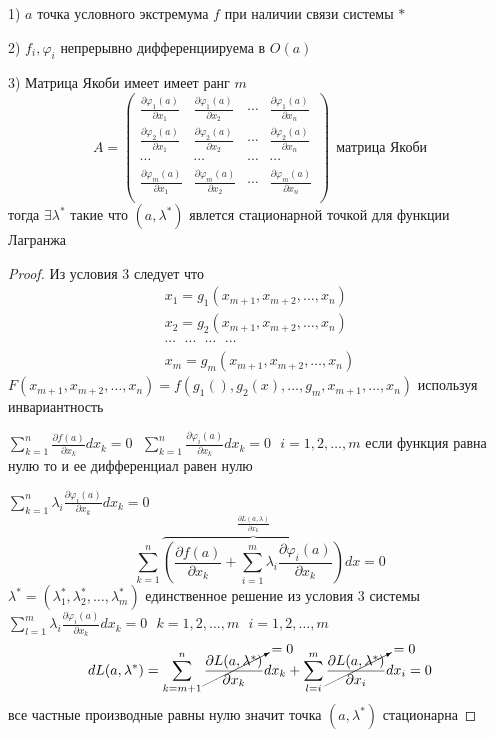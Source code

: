 \begin{theorem}
  1) $a$ точка условного экстремума $f$ при наличии связи системы $*$

  2) $f_i, \varphi_i$ непрерывно дифференциируема в $O(a)$

  3) Матрица Якоби имеет имеет ранг $m$
  $$
  A =
  \left(
  \begin{array}{cccc}
    \frac{\partial \varphi_1(a)}{\partial x_1} &
    \frac{\partial \varphi_1(a)}{\partial x_2} &
    \cdots &
    \frac{\partial \varphi_1(a)}{\partial x_n} \\

    \frac{\partial \varphi_2(a)}{\partial x_1} &
    \frac{\partial \varphi_2(a)}{\partial x_2} &
    \cdots &
    \frac{\partial \varphi_2(a)}{\partial x_n} \\
    \cdots & \cdots & \cdots & \cdots \\

    \frac{\partial \varphi_m(a)}{\partial x_1} &
    \frac{\partial \varphi_m(a)}{\partial x_2} &
    \cdots &
    \frac{\partial \varphi_m(a)}{\partial x_n} \\
  \end{array}
  \right) ~~ \text{матрица Якоби}
  $$
  тогда $\exists \lambda^*$ такие что $(a, \lambda^*)$ явлется стационарной
  точкой для функции Лагранжа
\end{theorem}

\begin{proof}
  Из условия 3 следует что
  $$
  \begin{array}{c}
    x_1 = g_1(x_{m+1}, x_{m+2}, \ldots, x_n) \\
    x_2 = g_2(x_{m+1}, x_{m+2}, \ldots, x_n) \\
    \cdots ~~~ \cdots ~~~ \cdots ~~~ \cdots \\
    x_m = g_m(x_{m+1}, x_{m+2}, \ldots, x_n)
  \end{array}
  $$
  $F(x_{m+1}, x_{m+2}, \ldots, x_n) = f(g_1(), g_2(x), \ldots, g_m, x_{m+1},
  \ldots, x_n)$ используя инвариантность

  $\sum_{k=1}^n \frac{\partial f(a)}{\partial x_k} dx_k = 0 ~~~
  \sum_{k=1}^n \frac{\partial \varphi_i(a)}{\partial x_k} dx_k = 0 ~~~
  i = 1, 2, \ldots, m$ если функция равна нулю то и ее дифференциал равен нулю

  $\sum_{k=1}^n \lambda_i \frac{\partial \varphi_i(a)}{\partial x_k} dx_k = 0$
  $$
  \sum_{k=1}^n \overbrace{\left( \frac{\partial f(a)}{\partial x_k} +
  \sum_{i=1}^m \lambda_i \frac{\partial \varphi_i(a)}{\partial x_k}
  \right)}^{\frac{\partial L(a, \lambda)}{\partial x_k}}dx = 0
  $$
  $\lambda^* = (\lambda_1^*, \lambda_2^*, \ldots, \lambda_m^*)$ единственное
  решение из условия 3 системы
  $\sum_{l=1}^m \lambda_i \frac{\partial \varphi_i(a)}{\partial x_k} dx_k = 0
  ~~~ k = 1,2,\ldots, m ~~~ i = 1,2,\ldots, m$
  $$
  dL(a, \lambda^*) = \sum_{k = m+1}^n \cancelto{= 0}{\frac{\partial
  L(a, \lambda^*)}{\partial x_k}} dx_k + \sum_{l=i}^m \cancelto{= 0}{\frac{
  \partial L(a, \lambda^*)}{\partial x_i}}dx_i = 0
  $$
  все частные производные равны нулю значит точка $(a, \lambda^*)$ стационарна
\end{proof}

